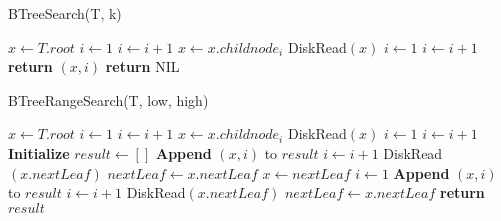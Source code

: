 \documentclass{article}
\begin{document}
\begin{algorithm}
\caption{BTreeSearch(T, k)}
\begin{algorithmic}[1]
\State $x \gets T.root$
    \State $i \gets 1$
        \State $i \gets i + 1$
    \EndWhile
    \State $x \gets x.childnode_i$
    \State DiskRead$(x)$
\EndWhile
\State $i \gets 1$
    \State $i \gets i + 1$
\EndWhile
{}
    \State \textbf{return} $(x, i)$
\Else
    \State \textbf{return} NIL
\EndIf
\end{algorithmic}
\end{algorithm}

\begin{algorithm}
\caption{BTreeRangeSearch(T, low, high)}
\begin{algorithmic}[1]
\State $x \gets T.root$
    \State $i \gets 1$
        \State $i \gets i + 1$
    \EndWhile
    \State $x \gets x.childnode_i$
    \State DiskRead$(x)$
\EndWhile
\State $i \gets 1$
    \State $i \gets i + 1$
\EndWhile
\State \textbf{Initialize} $result \gets []$
    \State \textbf{Append} $(x, i)$ to $result$
    \State $i \gets i + 1$
\EndWhile
\State DiskRead$(x.nextLeaf)$
\State $nextLeaf \gets x.nextLeaf$
    \State $x \gets nextLeaf$
    \State $i \gets 1$
        \State \textbf{Append} $(x, i)$ to $result$
        \State $i \gets i + 1$
    \EndWhile
    \State DiskRead$(x.nextLeaf)$
    \State $nextLeaf \gets x.nextLeaf$
\EndWhile
\State \textbf{return} $result$
\end{algorithmic}
\end{algorithm}
\end{document}
